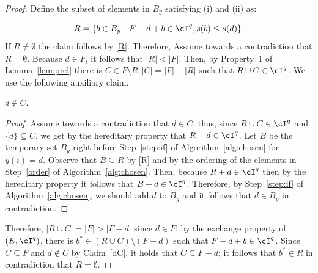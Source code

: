 \begin{proof}


Define the subset of elements in $B_y$ satisfying (i) and (ii) as: 

\begin{equation}
	\label{R}
	R = \{b \in B_y~|~ F-d+b \in \cI^q, s(b) \leq s(d)\}. 
\end{equation} If $R \neq \emptyset$ the claim follows by \eqref{R}. Therefore, Assume towards a contradiction that $R = \emptyset$. Because $d \in F$, it follows that $|R|<|F|$. Then, by Property~1 of Lemma~\ref{lem:prel} there is $C \in F \setminus R, |C| = |F|-|R|$ such that $R \cup C \in \cI^q$. We use the following auxiliary claim. 

\begin{claim}
\label{dC}
$d \notin C$. 
\end{claim}
\begin{proof}
Assume towards a contradiction that $d \in C$; thus, since $R \cup C \in \cI^q$ and $\{d\} \subseteq C$, we get by the hereditary property that $R+d \in \cI^q$. Let $B$ be the temporary set $B_y$ right before Step~\ref{step:if} of Algorithm~\ref{alg:chosen} for $y(i) = d$. Observe that $B \subseteq R$ by \eqref{R} and by the ordering of the elements in Step~\ref{order} of Algorithm~\ref{alg:chosen}. Then, because $R+d \in \cI^q$ then by the hereditary property it follows that $B+d \in \cI^q$. Therefore, by Step~\ref{step:if} of Algorithm~\ref{alg:chosen}, we should add $d$ to $B_y$ and it follows that $d \in B_y$ in contradiction. 
\end{proof} 	Therefore, $|R \cup C| = |F|> |F-d|$ since $d \in F$; by the exchange property of $(E,\cI^q)$, there is $b^* \in (R \cup C) \setminus (F-d)$ such that $F-d+b \in \cI^q$. Since $C \subseteq F$ and $d \notin C$ by Claim~\ref{dC}, it holds that $C \subseteq F-d$; it follows that $b^* \in R$ in contradiction that $R = \emptyset$. 
\end{proof}

